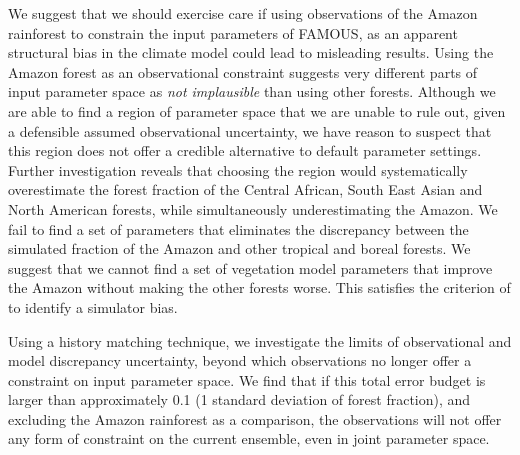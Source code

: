 \documentclass[esd, manuscript]{copernicus}
\begin{document}
We suggest that we should exercise care if using observations of the Amazon rainforest to constrain the input parameters of FAMOUS, as an apparent structural bias in the climate model could lead to misleading results. Using the Amazon forest as an observational constraint suggests very different parts of input parameter space as \emph{not implausible} than using other forests. Although we are able to find a region of parameter space that we are unable to rule out, given a defensible assumed observational uncertainty, we have reason to suspect that this region does not offer a credible alternative to default parameter settings. Further investigation reveals that choosing the region would systematically overestimate the forest fraction of the Central African, South East Asian and North American forests, while simultaneously underestimating the Amazon. We fail to find a set of parameters that eliminates the discrepancy between the simulated fraction of the Amazon and other tropical and boreal forests. We suggest that we cannot find a set of vegetation model parameters that improve the Amazon without making the other forests worse. This satisfies the criterion of \cite{williamson2014identifying} to identify a simulator bias. 

Using a history matching technique, we investigate the limits of observational and model discrepancy uncertainty, beyond which observations no longer offer a constraint on input parameter space. We find that if this total error budget is larger than approximately 0.1 (1 standard deviation of forest fraction), and excluding the Amazon rainforest as a comparison, the observations will not offer any form of constraint on the current ensemble, even in joint parameter space.

\end{document}

